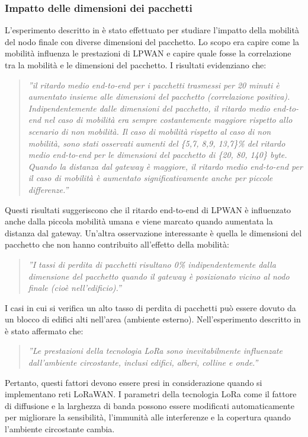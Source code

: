 \documentclass[a4paper]{report} %
\begin{document}
\subsubsection{Impatto delle dimensioni dei pacchetti} 
L'esperimento descritto in \cite{art:rif.47} è stato effettuato per studiare l'impatto della mobilità del nodo finale con diverse dimensioni del pacchetto. Lo scopo era capire come la mobilità influenza le prestazioni di LPWAN e capire quale fosse la correlazione tra la mobilità e le dimensioni del pacchetto. I risultati evidenziano che:
\begin{quote}
	\textit{''il ritardo medio end-to-end per i pacchetti trasmessi per 20 minuti è aumentato insieme alle dimensioni del pacchetto (correlazione positiva). 
	Indipendentemente dalle dimensioni del pacchetto, il ritardo medio end-to-end nel caso di mobilità era sempre costantemente maggiore rispetto allo scenario di non mobilità. 
	Il caso di mobilità rispetto al caso di non mobilità, sono stati osservati aumenti del \{5,7, 8,9, 13,7\}\% del ritardo medio end-to-end per le dimensioni del pacchetto di \{20, 80, 140\} byte. 
	Quando la distanza dal gateway è maggiore, il ritardo medio end-to-end per il caso di mobilità è aumentato significativamente anche per piccole differenze.''}
\end{quote}
Questi risultati suggeriscono che il ritardo end-to-end di LPWAN è influenzato anche dalla piccola mobilità umana e viene marcato quando aumentata la distanza dal gateway. Un'altra osservazione interessante è quella le dimensioni del pacchetto che non hanno contribuito all'effetto della mobilità:
\begin{quote}
	\textit{''I tassi di perdita di pacchetti risultano 0\% indipendentemente dalla dimensione del pacchetto quando il gateway è posizionato vicino al nodo finale (cioè nell'edificio).''}
\end{quote}
I casi in cui si verifica un alto tasso di perdita di pacchetti può essere dovuto da un blocco di edifici alti nell'area (ambiente esterno). Nell'esperimento descritto in \cite{art:rif.44} è stato affermato che:
\begin{quote}
	\textit{''Le prestazioni della tecnologia LoRa sono inevitabilmente influenzate dall'ambiente circostante, inclusi edifici, alberi, colline e onde.''}
\end{quote}
Pertanto, questi fattori devono essere presi in considerazione quando si implementano reti LoRaWAN. I parametri della tecnologia LoRa come il fattore di diffusione e la larghezza di banda possono essere modificati automaticamente per migliorare la sensibilità, l'immunità alle interferenze e la copertura quando l'ambiente circostante cambia.
\end{document}
